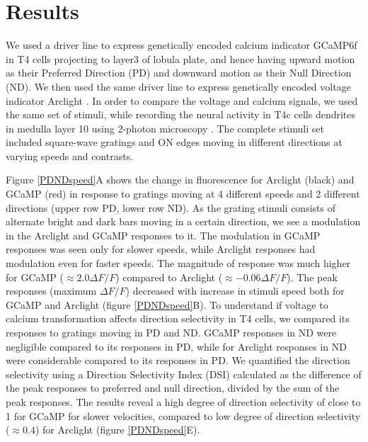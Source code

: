 \documentclass[9pt,lineno]{elife}
\begin{document}
\section{Results}

We used a driver line to express genetically encoded calcium indicator GCaMP6f \parencite{Chen2013} in T4 cells projecting to layer3 of lobula plate, and hence having upward motion as their Preferred Direction (PD) and downward motion as their Null Direction (ND). We then used the same driver line to express genetically encoded voltage indicator Arclight \parencite{Jin2012}. %
In order to compare the voltage and calcium signals, we used the same set of stimuli, while recording the neural activity in T4c cells dendrites in medulla layer 10 using 2-photon microscopy \parencite{Denk1990}. The complete stimuli set included square-wave gratings and ON edges moving in different directions at varying speeds and contrasts.

Figure \ref{PDNDspeed}A shows the change in fluorescence for Arclight (black) and GCaMP (red) in response to gratings moving at 4 different speeds and 2 different directions (upper row PD, lower row ND). As the grating stimuli consists of alternate bright and dark bars moving in a certain direction, we see a modulation in the Arclight and GCaMP responses to it. The modulation in GCaMP responses was seen only for slower speeds, while Arclight responses had modulation even for faster speeds. The magnitude of response was much higher for GCaMP ($\approx2.0 \Delta F/F$) compared to Arclight ($\approx -0.06 \Delta F/F$). The peak responses (maximum $\Delta F/F$) decreased with increase in stimuli speed both for GCaMP and Arclight (figure \ref{PDNDspeed}B). To understand if voltage to calcium transformation affects direction selectivity in T4 cells, we compared its responses to gratings moving in PD and ND. GCaMP responses in ND were negligible compared to its responses in PD, while for Arclight responses in ND were considerable compared to its responses in PD. We quantified the direction selectivity using a Direction Selectivity Index (DSI) calculated as the difference of the peak responses to preferred and null direction, divided by the sum of the peak responses. The results reveal a high degree of direction selectivity of close to 1 for GCaMP for slower velocities, compared to low degree of direction selectivity ($\approx0.4$) for Arclight (figure \ref{PDNDspeed}E).
\end{document}
